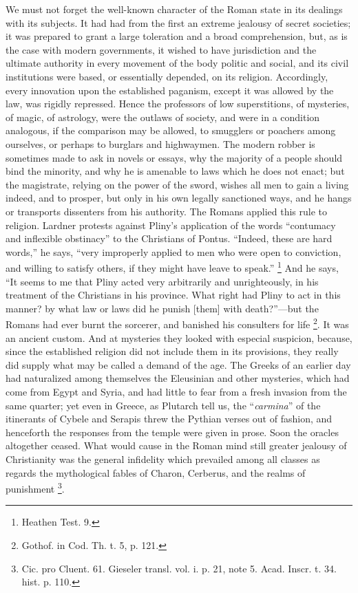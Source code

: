 We must not forget the well-known character of the
Roman state in its dealings with its subjects. It had had
from the first an extreme jealousy of secret societies;
it was prepared to grant a large toleration and a broad
comprehension, but, as is the case with modern
governments, it wished to have jurisdiction and the
ultimate authority in every movement of the body politic
and social, and its civil institutions were based, or
essentially depended, on its religion. Accordingly, every
innovation upon the established paganism, except it was
allowed by the law, was rigidly repressed. Hence the
professors of low superstitions, of mysteries, of magic,
of astrology, were the outlaws of society, and were in a
condition analogous, if the comparison may be allowed, to
smugglers or poachers among ourselves, or perhaps to
burglars and highwaymen. The modern robber is sometimes
made to ask in novels or essays, why the majority of a
people should bind the minority, and why he is amenable
to laws which he does not enact; but the magistrate,
relying on the power of the sword, wishes all men to gain
a living indeed, and to prosper, but only in his own
legally sanctioned ways, and he hangs or transports
dissenters from his authority. The Romans applied this
rule to religion. Lardner protests against Pliny's
application of the words ``contumacy and inflexible
obstinacy'' to the Christians of Pontus.
``Indeed, these are hard words,'' he says,
``very improperly applied to men who were open to
conviction, and willing to satisfy others, if they might
have leave to speak.'' \footnote{Heathen Test. 9.} And he says, ``It seems
to me that Pliny acted very arbitrarily and
unrighteously, in his treatment of the Christians in his
province. What right had Pliny to act in this manner? by
what law or laws did he punish [them] with
death?''—but the Romans had ever burnt the
sorcerer, and banished his consulters for life \footnote{Gothof. in Cod. Th. t. 5, p.
121.}. It
was an ancient custom. And at mysteries they looked with
especial suspicion, because, since the established
religion did not include them in its provisions, they
really did supply what may be called a demand of the age.
The Greeks of an earlier day had naturalized among
themselves the Eleusinian and other mysteries, which had
come from Egypt and Syria, and had little to fear from a
fresh invasion from the same quarter; yet even in Greece,
as Plutarch tell us, the ``\emph{carmina}'' of
the itinerants of Cybele and Serapis threw the Pythian
verses out of fashion, and henceforth the responses from
the temple were given in prose. Soon the oracles
altogether ceased. What would cause in the Roman mind
still greater jealousy of Christianity was the general
infidelity which prevailed among all classes as regards
the mythological fables of Charon, Cerberus, and the
realms of punishment \footnote{Cic. pro Cluent. 61. Gieseler
transl. vol. i. p. 21, note 5. Acad. Inscr. t. 34. hist.
p. 110.}.


